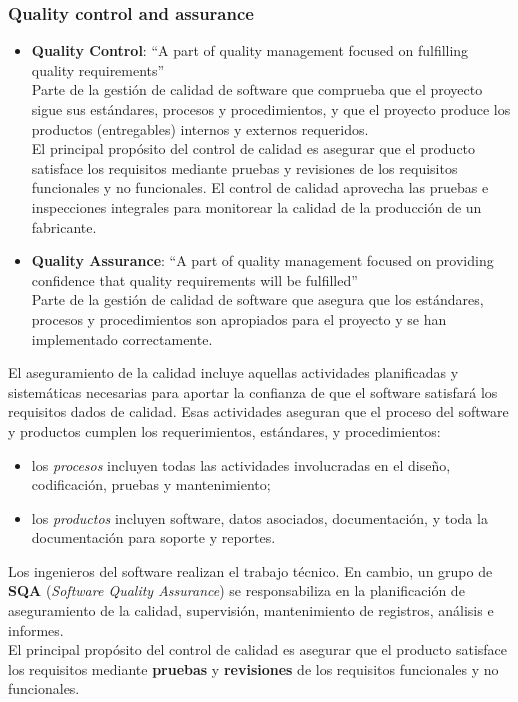 \subsubsection{Quality control and assurance}
\begin{itemize}
   \item \textbf{Quality Control}: ``A part of quality management focused on fulfilling quality
   requirements''\\
   Parte de la gestión de calidad de software que comprueba que el proyecto sigue sus estándares, procesos y procedimientos, y que el proyecto produce los productos (entregables) internos y externos requeridos.\\
   El principal propósito del control de calidad es asegurar que el producto satisface los requisitos mediante pruebas y revisiones de los requisitos funcionales y no funcionales. El control de calidad aprovecha las pruebas e inspecciones integrales para monitorear la calidad de la producción de un fabricante.

   \item \textbf{Quality Assurance}: ``A part of quality management focused on providing confidence that quality requirements will be fulfilled''\\
   Parte de la gestión de calidad de software que asegura que los estándares, procesos y procedimientos son apropiados para el proyecto y se han implementado correctamente.
\end{itemize}

{El aseguramiento de la calidad incluye aquellas actividades
planificadas y sistemáticas necesarias para aportar la
confianza de que el software satisfará los requisitos dados de
calidad.
Esas actividades aseguran que el proceso del software y productos cumplen los requerimientos, estándares, y procedimientos:\ns
\begin{itemize}
	\item los \textit{procesos} incluyen todas las actividades involucradas en el
diseño, codificación, pruebas y mantenimiento;
	\item los \textit{productos} incluyen software, datos asociados,
documentación, y toda la documentación para soporte y
reportes.
\end{itemize}}

Los ingenieros del software realizan el trabajo técnico.
En cambio, un grupo de \textbf{SQA} (\textit{Software Quality Assurance}) se responsabiliza en la planificación de aseguramiento de la calidad, supervisión, mantenimiento de registros, análisis e informes.\\
El principal propósito del control de calidad es asegurar que el producto satisface los requisitos mediante \textbf{pruebas} y \textbf{revisiones} de los requisitos funcionales y no funcionales.

